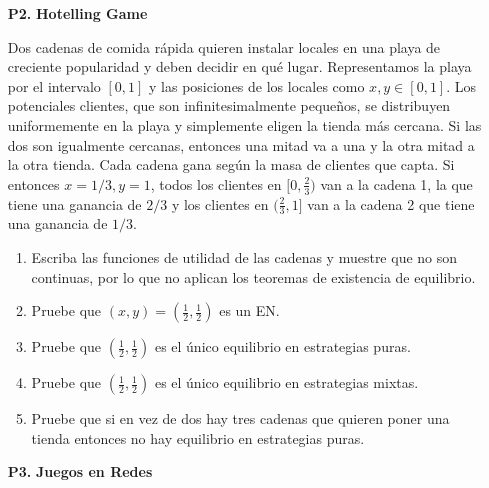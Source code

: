 \documentclass[11pt, spanish]{article}
\theoremstyle{plain}
\begin{document}
\begin{itemize}
\item[\textbf{P2.}] \textbf{Hotelling Game}

  Dos cadenas de comida rápida quieren
  instalar locales en una playa de creciente popularidad y deben decidir en
  qu\'e lugar. Representamos la playa por el intervalo $[0,1]$ y las posiciones
  de los locales como $x,y\in [0,1]$. Los potenciales clientes, que son
  infinitesimalmente pequeños, se distribuyen
  uniformemente en la playa y simplemente eligen la tienda más cercana. Si las
  dos son igualmente cercanas, entonces una mitad va a una y la otra mitad a la
  otra tienda. Cada cadena gana según la masa de clientes que capta.
  Si entonces $x=1/3, y=1$, todos los clientes en $[0,\frac{2}{3})$
  van a la cadena 1, la que tiene una ganancia de $2/3$ y los clientes en
  $(\frac{2}{3},1]$ van a la cadena 2 que tiene una ganancia de $1/3$.

  \begin{enumerate}
    \item Escriba las funciones de utilidad de las cadenas y muestre que no
      son continuas, por lo que no aplican los teoremas de existencia de equilibrio.
    \item Pruebe que $(x,y)= (\frac{1}{2},\frac{1}{2})$ es un EN.
    \item Pruebe que $(\frac{1}{2},\frac{1}{2})$ es el único equilibrio
      en estrategias puras.
    \item Pruebe que $(\frac{1}{2},\frac{1}{2})$ es el único equilibrio en
      estrategias mixtas.
    \item Pruebe que si en vez de dos hay tres cadenas que quieren poner una tienda
      entonces no hay equilibrio en estrategias puras.
  \end{enumerate}

\newpage

\item[\textbf{P3.}] \textbf{Juegos en Redes}


\end{itemize}
\end{document}
